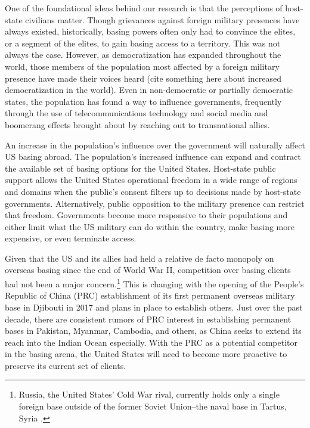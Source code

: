 One of the foundational ideas behind our research is that the perceptions of host-state civilians matter. Though grievances against foreign military presences have always existed, historically, basing powers often only had to convince the elites, or a segment of the elites, to gain basing access to a territory. This was not always the case. \autocite{Gillem2007} However, as democratization has expanded throughout the world, those members of the population most affected by a foreign military presence have made their voices heard (cite something here about increased democratization in the world). Even in non-democratic or partially democratic states, the population has found a way to influence governments, frequently through the use of telecommunications technology and social media and boomerang effects brought about by reaching out to transnational allies.\autocite{Keck1999,Steinert2017}

An increase in the population's influence over the government will naturally affect US basing abroad. The population's increased influence can expand and contract the available set of basing options for the United States. Host-state public support allows the United States operational freedom in a wide range of regions and domains when the public's consent filters up to decisions made by host-state governments. Alternatively, public opposition to the military presence can restrict that freedom. Governments become more responsive to their populations and either limit what the US military can do within the country, make basing more expensive, or even terminate access. 

Given that the US and its allies had held a relative de facto monopoly on overseas basing since the end of World War II, competition over basing clients had not been a major concern.\footnote{Russia, the United States' Cold War rival, currently holds only a single foreign base outside of the former Soviet Union--the naval base in Tartus, Syria \autocite[see:][]{Nieman2020}.} This is changing with the opening of the People's Republic of China (PRC) establishment of its first permanent overseas military base in Djibouti in 2017 and plans in place to establish others.\autocite{Joyce2021,Kardon2021} Just over the past decade, there are consistent rumors of PRC interest in establishing permanent bases in Pakistan, Myanmar, Cambodia, and others, as China seeks to extend its reach into the Indian Ocean especially. With the PRC as a potential competitor in the basing arena, the United States will need to become more proactive to preserve its current set of clients. 

